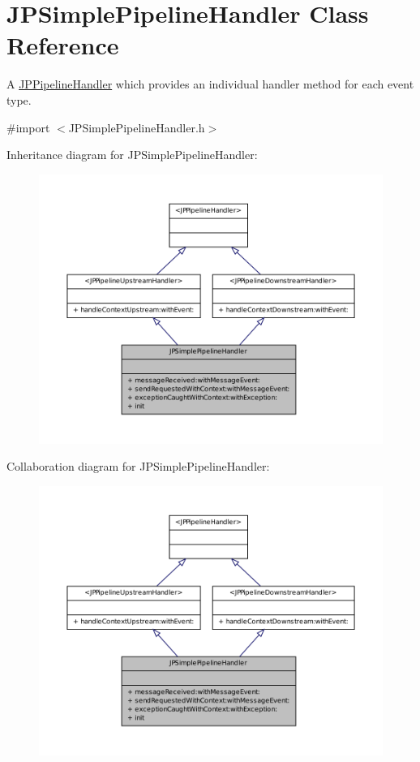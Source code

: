 \hypertarget{a00038}{
\section{JPSimplePipelineHandler Class Reference}
\label{a00038}
}


A \hyperlink{a00029}{JPPipelineHandler} which provides an individual handler method for each event type.  




{\ttfamily \#import $<$JPSimplePipelineHandler.h$>$}



Inheritance diagram for JPSimplePipelineHandler:\nopagebreak
\begin{figure}[H]
\begin{center}
\leavevmode
\includegraphics[width=400pt]{a00161}
\end{center}
\end{figure}


Collaboration diagram for JPSimplePipelineHandler:\nopagebreak
\begin{figure}[H]
\begin{center}
\leavevmode
\includegraphics[width=400pt]{a00162}
\end{center}
\end{figure}
